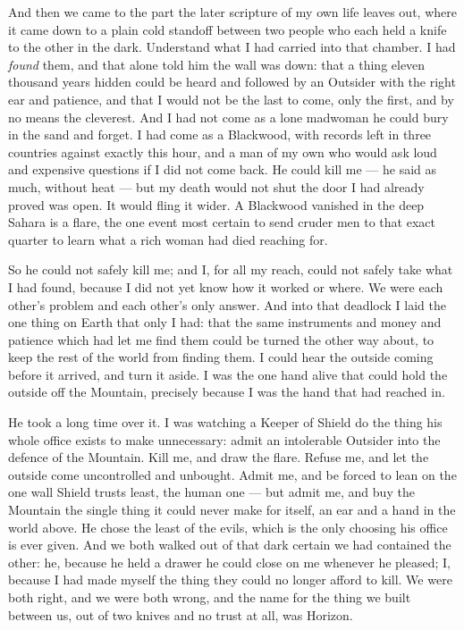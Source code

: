 And then we came to the part the later scripture of my own life leaves out, where it came down to a plain cold standoff between two people who each held a knife to the other in the dark. Understand what I had carried into that chamber. I had \emph{found} them, and that alone told him the wall was down: that a thing eleven thousand years hidden could be heard and followed by an Outsider with the right ear and patience, and that I would not be the last to come, only the first, and by no means the cleverest. And I had not come as a lone madwoman he could bury in the sand and forget. I had come as a Blackwood, with records left in three countries against exactly this hour, and a man of my own who would ask loud and expensive questions if I did not come back. He could kill me --- he said as much, without heat --- but my death would not shut the door I had already proved was open. It would fling it wider. A Blackwood vanished in the deep Sahara is a flare, the one event most certain to send cruder men to that exact quarter to learn what a rich woman had died reaching for.\par

So he could not safely kill me; and I, for all my reach, could not safely take what I had found, because I did not yet know how it worked or where. We were each other's problem and each other's only answer. And into that deadlock I laid the one thing on Earth that only I had: that the same instruments and money and patience which had let me find them could be turned the other way about, to keep the rest of the world from finding them. I could hear the outside coming before it arrived, and turn it aside. I was the one hand alive that could hold the outside off the Mountain, precisely because I was the hand that had reached in.\par

He took a long time over it. I was watching a Keeper of Shield do the thing his whole office exists to make unnecessary: admit an intolerable Outsider into the defence of the Mountain. Kill me, and draw the flare. Refuse me, and let the outside come uncontrolled and unbought. Admit me, and be forced to lean on the one wall Shield trusts least, the human one --- but admit me, and buy the Mountain the single thing it could never make for itself, an ear and a hand in the world above. He chose the least of the evils, which is the only choosing his office is ever given. And we both walked out of that dark certain we had contained the other: he, because he held a drawer he could close on me whenever he pleased; I, because I had made myself the thing they could no longer afford to kill. We were both right, and we were both wrong, and the name for the thing we built between us, out of two knives and no trust at all, was Horizon.\par

